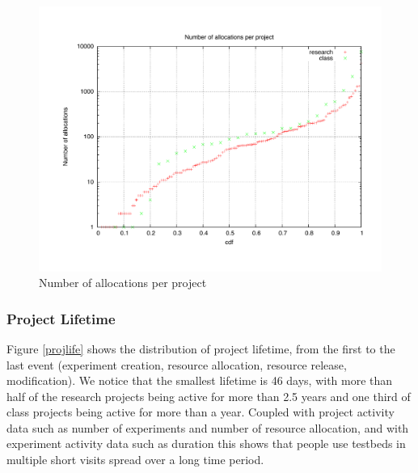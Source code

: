 \documentclass[10pt]{article}
\begin{document}
\begin{figure}[htbp]
\begin{center}
\includegraphics[width=5in]{figs/projswap.pdf}
\caption{Number of allocations per project}
\label{projswap}
\end{center}
\end{figure}

\subsubsection{Project Lifetime}
Figure \ref{projlife} shows the distribution of project lifetime,
from the first to the last event (experiment creation, resource allocation, resource release, modification). We notice that the smallest lifetime is 46 days,
with more than half of the research projects being active for more than
2.5 years and one third of class projects being active for more than a
year. Coupled with project activity data such as number of experiments
and number of resource allocation, and with experiment activity data such as
duration this shows that people use testbeds in multiple short visits
spread over a long time period.
\end{document}
